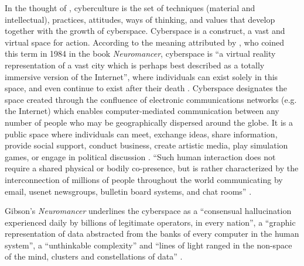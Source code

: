\documentclass[english]{textolivre}
\begin{document}
In the thought of \textcite[p.~17]{levy_cibercultura_1999b}, cyberculture is the set of techniques (material and intellectual), practices, attitudes, ways of thinking, and values that develop together with the growth of cyberspace. Cyberspace is a construct, a vast and virtual space for action. According to the meaning attributed by \textcite{gibson_neuromancer_2003}, who coined this term in 1984 in the book \textit{Neuromancer}, cyberspace is “a virtual reality representation of a vast city which is perhaps best described as a totally immersive version of the Internet”, where individuals can exist solely in this space, and even continue to exist after their death \cite[p.~39]{bell_cyberculture:_2005}. Cyberspace designates the space created through the confluence of electronic communications networks (e.g. the Internet) which enables computer-mediated communication between any number of people who may be geographically dispersed around the globe. It is a public space where individuals can meet, exchange ideas, share information, provide social support, conduct business, create artistic media, play simulation games, or engage in political discussion \cite[p.~41]{bell_cyberculture:_2005}. “Such human interaction does not require a shared physical or bodily co-presence, but is rather characterized by the interconnection of millions of people throughout the world communicating by email, usenet newsgroups, bulletin board systems, and chat rooms” \cite[p.~41]{bell_cyberculture:_2005}.

Gibson’s \textit{Neuromancer} underlines the cyberspace as a “consensual hallucination experienced daily by billions of legitimate operators, in every nation”, a “graphic representation of data abstracted from the banks of every computer in the human system”, a “unthinkable complexity” and “lines of light ranged in the non-space of the mind, clusters and constellations of data” \cite[p.~51]{gibson_neuromancer_2003}.
\end{document}
